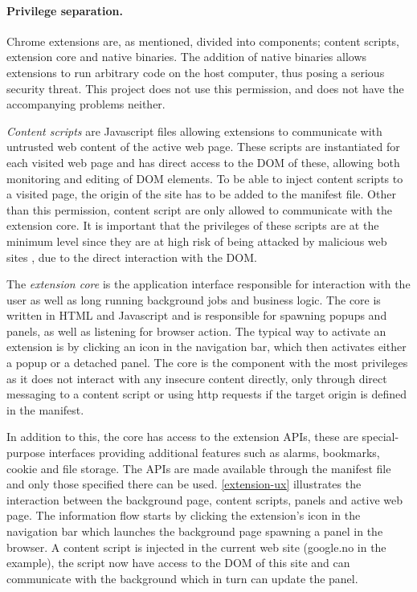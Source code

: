 \paragraph{Privilege separation.} Chrome extensions are, as mentioned, divided into components; content scripts, extension core and native binaries. The addition of native binaries allows extensions to run arbitrary code on the host computer, thus posing a serious security threat. This project does not use this permission, and does not have the accompanying problems neither. 
\par \emph{Content scripts} are Javascript files allowing extensions to communicate with untrusted web content of the active web page. These scripts are instantiated for each visited web page and has direct access to the DOM of these, allowing both monitoring and editing of DOM elements. To be able to inject content scripts to a visited page, the origin of the site has to be added to the manifest file. Other than this permission, content script are only allowed to communicate with the extension core. It is important that the privileges of these scripts are at the minimum level since they are at high risk of being attacked by malicious web sites \cite{chrome-extension-dangers}, due to the direct interaction with the DOM. 
\par The \emph{extension core} is the application interface responsible for interaction with the user as well as long running background jobs and business logic. The core is written in HTML and Javascript and is responsible for spawning popups and panels, as well as listening for browser action. The typical way to activate an extension is by clicking an icon in the navigation bar, which then activates either a popup or a detached panel. The core is the component with the most privileges as it does not interact with any insecure content directly, only through direct messaging to a content script or using http requests if the target origin is defined in the manifest. 
\par In addition to this, the core has access to the extension APIs, these are special-purpose interfaces providing additional features such as alarms, bookmarks, cookie and file storage. The APIs are made available through the manifest file and only those specified there can be used. \autoref{extension-ux} illustrates the interaction between the background page, content scripts, panels and active web page. The information flow starts by clicking the extension's icon in the navigation bar which launches the background page spawning a panel in the browser. A content script is injected in the current web site (google.no in the example), the script now have access to the DOM of this site and can communicate with the background which in turn can update the panel. 


